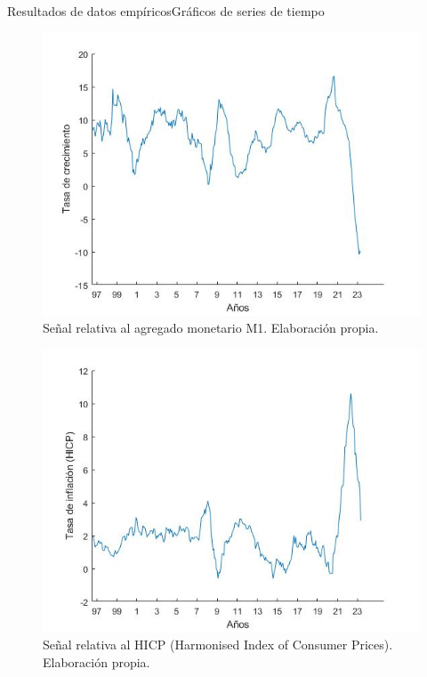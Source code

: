\documentclass[11pt]{beamer}
\begin{document}
    \begin{frame}{Resultados de datos empíricos}{Gráficos de series de tiempo}
	\begin{multicols}{2}
	    \begin{figure}[H]
		\centering
		\includegraphics[scale=0.32]{M1s.jpg}
		\caption{\tiny Señal relativa al agregado monetario M1. Elaboración propia.}
		\label{fig:M1}
	    \end{figure}

	    \begin{figure}[H]
		\centering
		\includegraphics[scale=0.32]{infs.jpg}
		\caption{\tiny Señal relativa al HICP (Harmonised Index of Consumer Prices). Elaboración propia.}
		\label{fig:inf}
	    \end{figure}
	\end{multicols}
    \end{frame}
\end{document}
